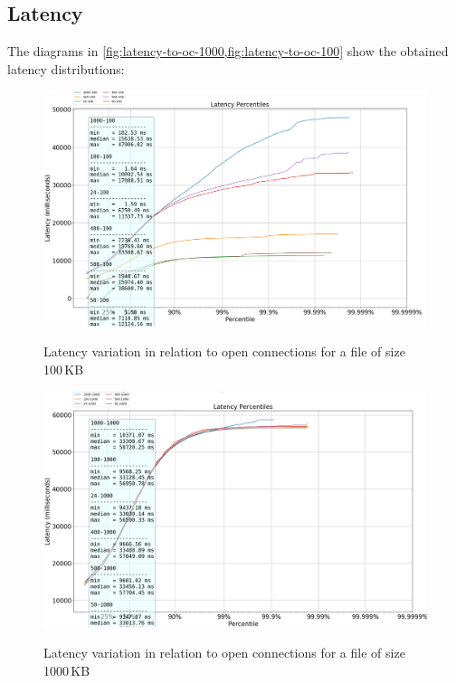 \documentclass[runningheads]{llncs}
\begin{document}
\subsection{Latency}\label{subsec:latency}
The diagrams in \cref{fig:latency-to-oc-1000,fig:latency-to-oc-100} show the obtained latency distributions:
\begin{figure}
    \centering
    \begin{minipage}{0.49\textwidth}
        \centering\vspace{-2em}
        \includegraphics[width=1\textwidth]{plotfile100.png}\vspace{-2em}
        \caption{Latency variation in relation to open connections for a file of size 100\,KB}\vspace{-1.5em}
			\label {fig:latency-to-oc-100}
    \end{minipage}\hfill
    \begin{minipage}{0.49\textwidth}
        \centering\vspace{-2em}
        \includegraphics[width=1\textwidth]{plotfile1000.png}\vspace{-2em}
        \caption{Latency variation in relation to open connections for a file of size 1000\,KB}\vspace{-1.5em}
	   \label {fig:latency-to-oc-1000}
    \end{minipage}
\end{figure}
\end{document}
